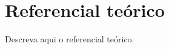 \section{Referencial teórico}
\label{sec:referencial-teorico}

%

Descreva aqui o referencial teórico.

